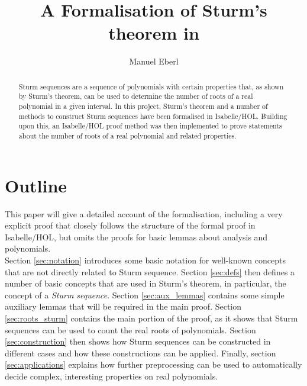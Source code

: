 \documentclass[11pt,a4paper,oneside]{article}
\title{A Formalisation of Sturm's theorem in \isabellehol}
\author{Manuel Eberl}
\newcommand{\isabellehol}{\mbox{Isabelle}\slash HOL\xspace}
\begin{document}
\maketitle

\begin{abstract}
Sturm sequences are a sequence of polynomials with certain properties that, as shown by Sturm's theorem, can be used to determine the number of roots of a real polynomial in a given interval. In this project, Sturm's theorem and a number of me\-thods to construct Sturm sequences have been formalised in Isabelle\slash HOL. Buil\-ding upon this, an Isabelle\slash HOL proof method was then implemented to prove statements about the number of roots of a real polynomial and related properties.
\end{abstract}\vskip10mm

\tableofcontents
\newpage
\parindent0mm

\section{Outline}

This paper will give a detailed account of the formalisation, including a very explicit proof that closely follows the structure of the formal proof in \isabellehol, but omits the proofs for basic lemmas about analysis and polynomials.\\

Section \ref{sec:notation} introduces some basic notation for well-known concepts that are not directly related to Sturm sequence. Section \ref{sec:defs} then defines a number of basic concepts that are used in Sturm's theorem, in particular, the concept of a \emph{Sturm sequence}. Section \ref{sec:aux_lemmas} contains some simple auxiliary lemmas that will be required in the main proof. Section \ref{sec:roots_sturm} contains the main portion of the proof, as it shows that Sturm sequences can be used to count the real roots of polynomials. Section \ref{sec:construction} then shows how Sturm sequences can be constructed in different cases and how these constructions can be applied. Finally, section \ref{sec:applications} explains how further preprocessing can be used to automatically decide complex, interesting properties on real polynomials.
\end{document}
